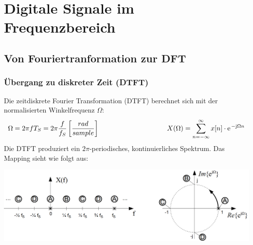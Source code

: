 



\chapter{Digitale Signale im Frequenzbereich}
\section{Von Fouriertranformation zur DFT}
\subsection{Übergang zu diskreter Zeit (DTFT)}
Die zeitdiskrete Fourier Transformation (DTFT) berechnet sich mit der normalisierten Winkelfrequenz $\Omega$:
\[ \Omega = 2\pi f T_S = 2\pi\frac{f}{f_S} \left[\frac{rad}{sample}\right] \hspace{35mm} 
X(\Omega) = \sum_{n=-\infty}^{\infty} x[n] \cdot \e^{-\im\Omega n} \]
Die DTFT produziert ein $2\pi$-periodisches, kontinuierliches Spektrum.
Das Mapping sieht wie folgt aus:
\begin{center}
	\includegraphics[width=.7\textwidth]{../fig/dtft_frequency_mapping}
\end{center}

